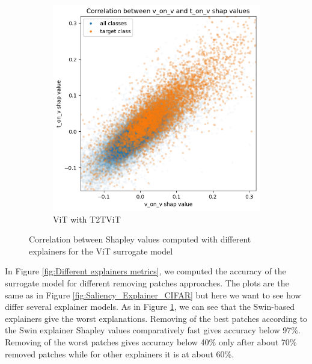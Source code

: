 \documentclass[magisterska,en]{pracamgr}
\begin{document}
\begin{figure}
\begin{subfigure}{.45\textwidth}
  \centering
  \includegraphics[width=1\linewidth]{./images/v_and_t_on_vit.png}
  \caption{ViT with T2T\textunderscore ViT }
\end{subfigure}


\caption{Correlation between Shapley values computed with different explainers for the ViT surrogate model}
\label{fig:Pairs Shapley correlation}
\end{figure}




In Figure \ref{fig:Different explainers metrics}, we computed the accuracy of the surrogate model for different removing patches approaches. The plots are the same as in Figure \ref{fig:Saliency_Explainer_CIFAR} but here we want to see how differ several explainer models. As in Figure \ref{fig:Pairs Shapley correlation}, we can see that the Swin-based explainers give the worst explanations. Removing of the best patches according to the Swin explainer Shapley values comparatively fast gives accuracy below 97\%. Removing of the worst patches gives accuracy below 40\% only after about 70\% removed patches while for other explainers it is at about 60\%.
\end{document}
